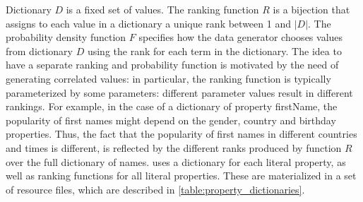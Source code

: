 Dictionary $D$ is a fixed set of values. The ranking function $R$ is a bijection
that assigns to each value in a dictionary a unique rank between 1 and $|D|$.
The probability density function $F$ specifies how the data generator chooses
values from dictionary $D$ using the rank for each term in the dictionary. The
idea to have a separate ranking and probability function is motivated by the
need of generating correlated values: in particular, the ranking function is
typically parameterized by some parameters: different parameter values result
in different rankings. For example, in the case of a dictionary of property
firstName, the popularity of first names might depend on the gender, country
and birthday properties. Thus, the fact that the popularity of first names in
different countries and times is different, is reflected by the different ranks
produced by function $R$ over the full dictionary of names.  \datagen uses a
dictionary for each literal property, as well as ranking functions for all
literal properties. These are materialized in a set of resource files, which
are described in \autoref{table:property_dictionaries}.

